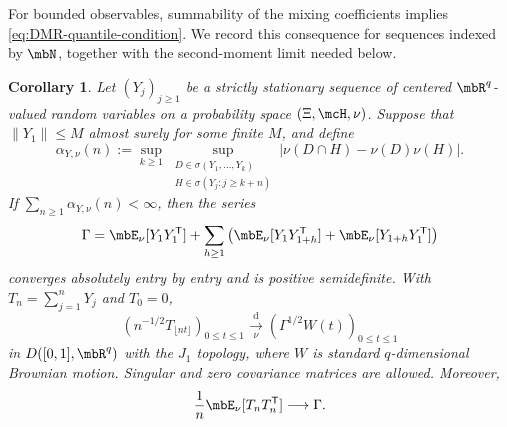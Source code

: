 \documentclass[a4paper]{article}
\numberwithin{equation}{section}   %
\theoremstyle{plain}   %
\theoremstyle{plain}   %
\newtheorem{cor}[lemma]{Corollary}   %
\theoremstyle{examplestyle}
\begin{document}
    For bounded observables, summability of the mixing coefficients implies \eqref{eq:DMR-quantile-condition}. We record this consequence for sequences indexed by $\mbN$, together with the second-moment limit needed below.

    \begin{cor}
    \label{thm:FCLT_alpha}
        Let $(Y_j)_{j\ge1}$ be a strictly stationary sequence of centered $\mbR^q$-valued random variables on a probability space $(\Xi,\mcH,\nu)$. 
        Suppose that $\|Y_1\|\le M$ almost surely for some finite $M$, and define
        \[
             \alpha_{Y,\nu}(n)
             :=\sup_{k\ge1}\sup_{\substack{D\in\sigma(Y_1,\ldots,Y_k)\\
                                          H\in\sigma(Y_j:j\ge k+n)}}
                   |\nu(D\cap H)-\nu(D)\nu(H)|.
        \]
        If $\sum_{n\ge1}\alpha_{Y,\nu}(n)<\infty$, then the series
        \[
             \Gamma=\mbE_\nu[Y_1Y_1^{\mathsf T}]
             +\sum_{h\ge1}\left(
               \mbE_\nu[Y_1Y_{1+h}^{\mathsf T}]
              +\mbE_\nu[Y_{1+h}Y_1^{\mathsf T}]\right)
        \]
        converges absolutely entry by entry and is positive semidefinite. 
        With $T_n=\sum_{j=1}^nY_j$ and $T_0=0$,
        \[
             \left(n^{-1/2}T_{\lfloor nt\rfloor}\right)_{0\le t\le1}
             \underset{\nu}{\overset{\mathrm d}{\longrightarrow}}
             \left(\Gamma^{1/2}W(t)\right)_{0\le t\le1}
        \]
        in $D([0,1],\mbR^q)$ with the $J_1$ topology, where $W$ is standard $q$-dimensional Brownian motion. Singular and zero covariance matrices are allowed. Moreover,
        \[
            \frac1n\mbE_\nu[T_nT_n^{\mathsf T}]\longrightarrow\Gamma.
        \]
    \end{cor}
\end{document}
